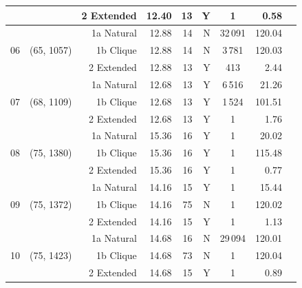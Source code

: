 \documentclass{article}
\begin{document}
\begin{table}[h]
\begin{tabular}{llrrrrcrr}
 & & 2 Extended  & 12.40 & 13 & Y & 1 &   0.58 \\
\midrule
\multirow{3}{*}{06} & \multirow{3}{*}{(65, 1057)}
   & 1a Natural  & 12.88 & 14 & N & 32\,091 & 120.04 \\
 & & 1b Clique   & 12.88 & 14 & N & 3\,781  & 120.03 \\
 & & 2 Extended  & 12.88 & 13 & Y & 413     &   2.44 \\
\midrule
\multirow{3}{*}{07} & \multirow{3}{*}{(68, 1109)}
   & 1a Natural  & 12.68 & 13 & Y & 6\,516 &  21.26 \\
 & & 1b Clique   & 12.68 & 13 & Y & 1\,524 & 101.51 \\
 & & 2 Extended  & 12.68 & 13 & Y & 1      &   1.76 \\
\midrule
\multirow{3}{*}{08} & \multirow{3}{*}{(75, 1380)}
   & 1a Natural  & 15.36 & 16 & Y & 1 &  20.02 \\
 & & 1b Clique   & 15.36 & 16 & Y & 1 & 115.48 \\
 & & 2 Extended  & 15.36 & 16 & Y & 1 &   0.77 \\
\midrule
\multirow{3}{*}{09} & \multirow{3}{*}{(75, 1372)}
   & 1a Natural  & 14.16 & 15 & Y & 1 &  15.44 \\
 & & 1b Clique   & 14.16 & 75 & N & 1 & 120.02 \\
 & & 2 Extended  & 14.16 & 15 & Y & 1 &   1.13 \\
\midrule
\multirow{3}{*}{10} & \multirow{3}{*}{(75, 1423)}
   & 1a Natural  & 14.68 & 16 & N & 29\,094 & 120.01 \\
 & & 1b Clique   & 14.68 & 73 & N & 1       & 120.04 \\
 & & 2 Extended  & 14.68 & 15 & Y & 1       &   0.89 \\
\bottomrule
\end{tabular}
\end{table}
\end{document}
